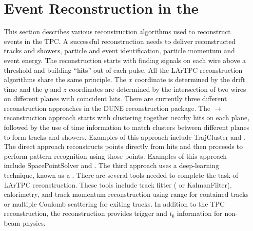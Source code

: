 \section{Event Reconstruction in the }
\label{sec:tools-fdreco}

This section describes various reconstruction algorithms used to reconstruct events in the  TPC. A successful \lartpc reconstruction needs to deliver reconstructed tracks and showers, particle and event identification, particle momentum and event energy. The reconstruction starts with finding signals on each wire above a threshold and building ``hits'' out of each pulse. All the LArTPC \threed reconstruction algorithms share the same principle. The $x$ coordinate is determined by the drift time and the $y$ and $z$ coordinates are determined by the intersection of two wires on different planes with coincident hits. There are currently three different reconstruction approaches in the DUNE reconstruction package. The \twod$\rightarrow$\threed reconstruction approach starts with clustering together nearby hits on each plane, %
followed by the use of time information to match \twod clusters between different planes to form \threed tracks and showers. Examples of this approach include TrajCluster and .  The direct \threed approach reconstructs \threed points directly from hits and then proceeds to perform pattern recognition using those \threed points. Examples of this approach include SpacePointSolver and . The third approach uses a deep-learning technique, known as a . There are several tools needed to complete the task of LArTPC reconstruction. These tools include track fitter ( or KalmanFilter), calorimetry,  and track momentum reconstruction using range for contained tracks or multiple Coulomb scattering for exiting tracks. In addition to the TPC reconstruction, the  reconstruction provides trigger and $t_0$ information for non-beam physics. 

